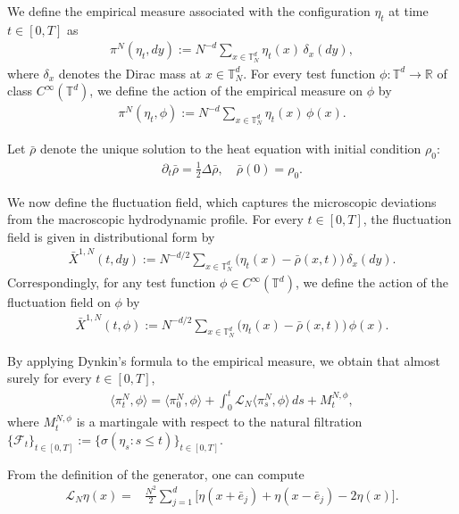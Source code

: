 \documentclass[UTF-8,reqno]{amsart}
\numberwithin{equation}{section}
\def\leq{\leqslant}
\def\leq{\leqslant}
\begin{document}
We define the empirical measure associated with the configuration $\eta_t$ at time $t\in[0,T]$ as
\begin{align*}
\pi^N(\eta_t, dy) := N^{-d} \sum_{x \in \mathbb{T}^d_N} \eta_t(x)\, \delta_{x}(dy),
\end{align*}
where $\delta_{x}$ denotes the Dirac mass at $x \in \mathbb{T}^d_N$. For every test function $\phi: \mathbb{T}^d \to \mathbb{R}$ of class $C^\infty(\mathbb{T}^d)$, we define the action of the empirical measure on $\phi$ by
\begin{align*}
\pi^N(\eta_t, \phi) := N^{-d} \sum_{x \in \mathbb{T}^d_N} \eta_t(x)\, \phi(x).
\end{align*}

Let $\bar{\rho}$ denote the unique solution to the heat equation with initial condition $\rho_0$:
\begin{align}\label{heat-equation}
\partial_t \bar{\rho} = \frac{1}{2}\Delta \bar{\rho}, \quad \bar{\rho}(0) = \rho_0.
\end{align}

We now define the fluctuation field, which captures the microscopic deviations from the macroscopic hydrodynamic profile. For every $t \in [0,T]$, the fluctuation field is given in distributional form by
\begin{align*}
\bar{X}^{1,N}(t, dy) := N^{-d/2} \sum_{x \in \mathbb{T}^d_N} \big(\eta_t(x) - \bar{\rho}(x,t)\big)\, \delta_{x}(dy). 
\end{align*}
Correspondingly, for any test function $\phi \in C^\infty(\mathbb{T}^d)$, we define the action of the fluctuation field on $\phi$ by
\begin{align*}
\bar{X}^{1,N}(t, \phi) := N^{-d/2} \sum_{x \in \mathbb{T}^d_N} \big(\eta_t(x) - \bar{\rho}(x,t)\big)\, \phi(x).
\end{align*} 


By applying Dynkin's formula to the empirical measure, we obtain that almost surely for every $t\in[0,T]$, 
\begin{align}\label{Dynkin-1}
\langle \pi^N_t, \phi \rangle = \langle \pi^N_0, \phi \rangle + \int_0^t \mathcal{L}_N \langle \pi^N_s, \phi \rangle\, ds + M^{N,\phi}_t,
\end{align}
where $M^{N,\phi}_t$ is a martingale with respect to the natural filtration $\{\mathcal{F}_t\}_{t \in [0,T]} := \{\sigma(\eta_s: s \leq t)\}_{t \in [0,T]}$.

From the definition of the generator, one can compute
\begin{align}\label{L-N}
\mathcal{L}_N \eta(x) =& \frac{N^2}{2} \sum_{j=1}^d \big[\eta(x+\bar{e}_j) + \eta(x-\bar{e}_j) - 2\eta(x)\big]. 
\end{align}
\end{document}
